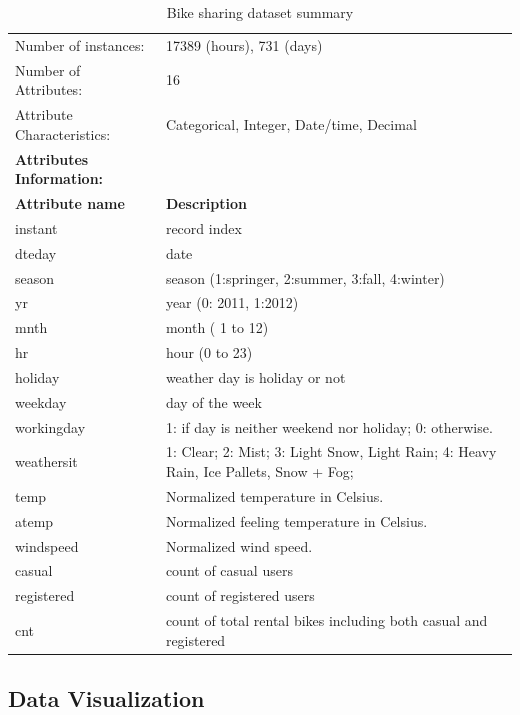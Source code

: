 \documentclass[12pt]{article}
\begin{document}
	\begin{table}[H]
		\label{table:dataset}
		\begin{tabular}{| p{5cm} | p{11cm} |} \hline
			Number of instances: & 17389 (hours), 731 (days)\\
			Number of Attributes: & 16\\ 
			Attribute Characteristics: &  Categorical, Integer,
			Date/time, Decimal\\
			\hline \hline
			\textbf{Attributes Information:} &\\ \hline
			\textbf{Attribute name } & \textbf{Description}\\ \hline
			instant   & record index\\ \hline
			dteday    & date\\ \hline
			season   & season (1:springer, 2:summer, 3:fall, 4:winter)\\ \hline
			yr    &  year (0: 2011, 1:2012)\\ \hline
			mnth &   month ( 1 to 12)\\ \hline
			hr & hour (0 to 23) \\ \hline
			holiday   & weather day is holiday or not \\ \hline
			weekday   &  day of the week \\ \hline
			workingday   & 1: if day is neither weekend nor holiday; 0: otherwise.\\ \hline
			weathersit   & 1: Clear; 2: Mist; 3: Light Snow, Light Rain; 4: Heavy Rain, Ice Pallets, Snow + Fog;\\ \hline
			temp   & Normalized temperature in Celsius. \\ \hline
			atemp    & Normalized feeling temperature in Celsius. \\ \hline
			windspeed   & Normalized wind speed. \\ \hline
			casual   & count of casual users\\ \hline
			registered   & count of registered users\\ \hline
			cnt   & count of total rental bikes including both casual and registered \\ \hline
		\end{tabular}
		\caption{Bike sharing dataset summary}
	\end{table}
	\subsection{Data Visualization}
	\label{sec:visual}
	
\end{document}
